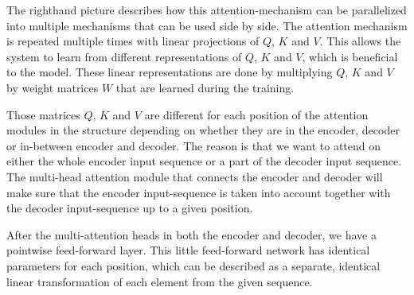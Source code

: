 The righthand picture describes how this attention-mechanism can be parallelized into multiple mechanisms that can be used side by side. The attention mechanism is repeated multiple times with linear projections of $Q$, $K$ and $V$. This allows the system to learn from different representations of $Q$, $K$ and $V$, which is beneficial to the model. These linear representations are done by multiplying $Q$, $K$ and $V$ by weight matrices $W$ that are learned during the training. \newline

Those matrices $Q$, $K$ and $V$ are different for each position of the attention modules in the structure depending on whether they are in the encoder, decoder or in-between encoder and decoder. The reason is that we want to attend on either the whole encoder input sequence or a part of the decoder input sequence. The multi-head attention module that connects the encoder and decoder will make sure that the encoder input-sequence is taken into account together with the decoder input-sequence up to a given position. \newline

After the multi-attention heads in both the encoder and decoder, we have a pointwise feed-forward layer. This little feed-forward network has identical parameters for each position, which can be described as a separate, identical linear transformation of each element from the given sequence.


